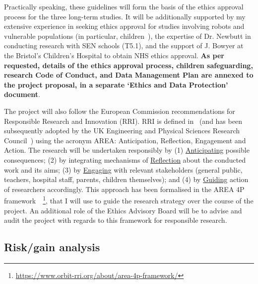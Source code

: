 \begin{rewrite}
Practically speaking, these guidelines will form the basis of the ethics
approval process for the three long-term \project studies. It will be
additionally supported by my extensive experience in seeking ethics approval for
studies involving robots and vulnerable populations (in particular,
children~\cite{lemaignan2016learning,lemaignan2018pinsoro,senft2019teaching}),
the expertise of Dr. Newbutt in conducting research with SEN schools (T5.1), and
the support of J. Bowyer at the Bristol's Children's Hospital to obtain NHS ethics
approval. \textbf{As per requested, details of the ethics approval process,
children safeguarding, research Code of Conduct, and Data Management Plan are
annexed to the project proposal, in a separate `Ethics and Data Protection'
document}.

The project will also follow the European Commission recommendations for
Responsible Research and Innovation (RRI). RRI is defined
in~\cite{stilgoe2013developing} (and has been subsequently adopted by the UK Engineering
and Physical Sciences Research Council~\cite{owen2014uk}) using the acronym
AREA: Anticipation, Reflection, Engagement and Action. The \project research
will be undertaken responsibly by (1) \ul{Anticipating} possible consequences;
(2) by integrating mechanisms of \ul{Reflection} about the conducted work and its
aims; (3) by \ul{Engaging} with relevant stakeholders (general public, teachers,
hospital staff, parents, children themselves); and (4) by \ul{Guiding} action of
researchers accordingly. This approach has been formalised in the AREA 4P
framework~\cite{stahl2018implementing}~\footnote{\url{https://www.orbit-rri.org/about/area-4p-framework/}},
that I will use to guide the research strategy over the course of the project.
An additional role of the Ethics Advisory Board will be to advise and audit the
project with regards to this framework for responsible research.

\end{rewrite}



\subsection{Risk/gain analysis}

